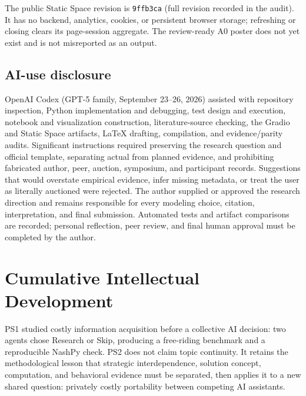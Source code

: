 The public Static Space revision is \texttt{9ffb3ca} (full revision recorded in the audit). It has no backend, analytics, cookies, or persistent browser storage; refreshing or closing clears its page-session aggregate. The review-ready A0 poster does not yet exist and is not misreported as an output.

\subsection{AI-use disclosure}
OpenAI Codex (GPT-5 family, September 23--26, 2026) assisted with repository inspection, Python implementation and debugging, test design and execution, notebook and visualization construction, literature-source checking, the Gradio and Static Space artifacts, LaTeX drafting, compilation, and evidence/parity audits. Significant instructions required preserving the research question and official template, separating actual from planned evidence, and prohibiting fabricated author, peer, auction, symposium, and participant records. Suggestions that would overstate empirical evidence, infer missing metadata, or treat the user as literally auctioned were rejected. The author supplied or approved the research direction and remains responsible for every modeling choice, citation, interpretation, and final submission. Automated tests and artifact comparisons are recorded; personal reflection, peer review, and final human approval must be completed by the author.

\section{Cumulative Intellectual Development}
PS1 studied costly information acquisition before a collective AI decision: two agents chose Research or Skip, producing a free-riding benchmark and a reproducible NashPy check. PS2 does not claim topic continuity. It retains the methodological lesson that strategic interdependence, solution concept, computation, and behavioral evidence must be separated, then applies it to a new shared question: privately costly portability between competing AI assistants.

